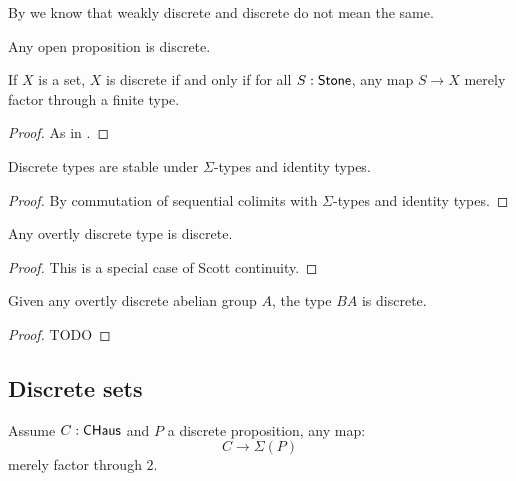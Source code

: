 By  we know that weakly discrete and discrete do not mean the same.

\begin{corollary}
Any open proposition is discrete.
\end{corollary}

\begin{lemma}\label{set-discrete}
If $X$ is a set, $X$ is discrete if and only if for all $S:\mathsf{Stone}$, any map $S\to X$ merely factor through a finite type.
\end{lemma}

\begin{proof}
As in .
\end{proof}

\begin{lemma}
Discrete types are stable under $\Sigma$-types and identity types.
\end{lemma}

\begin{proof}
By commutation of sequential colimits with $\Sigma$-types and identity types.
\end{proof}

\begin{lemma}
Any overtly discrete type is discrete.
\end{lemma}

\begin{proof}
This is a special case of Scott continuity.
\end{proof}

\begin{lemma}
Given any overtly discrete abelian group $A$, the type $BA$ is discrete.
\end{lemma}

\begin{proof}
TODO 
\end{proof}


\subsection{Discrete sets}

\begin{lemma}\label{factorisation-suspension-discrete}
Assume $C:\mathsf{CHaus}$ and $P$ a discrete proposition, any map:
\[C\to \Sigma(P)\]
merely factor through $2$. 
\end{lemma}


